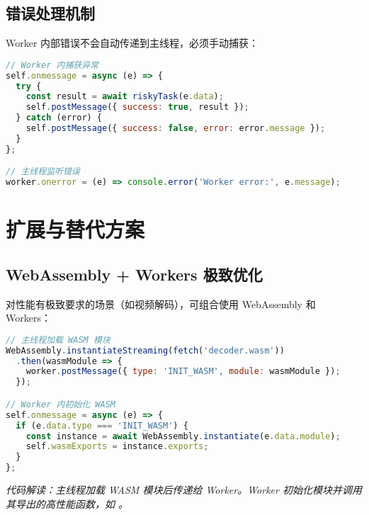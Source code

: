 \section{错误处理机制}
Worker 内部错误不会自动传递到主线程，必须手动捕获：\par
\begin{lstlisting}[language=javascript]
// Worker 内捕获异常
self.onmessage = async (e) => {
  try {
    const result = await riskyTask(e.data);
    self.postMessage({ success: true, result });
  } catch (error) {
    self.postMessage({ success: false, error: error.message });
  }
};

// 主线程监听错误
worker.onerror = (e) => console.error('Worker error:', e.message);
\end{lstlisting}
\chapter{扩展与替代方案}
\section{WebAssembly + Workers 极致优化}
对性能有极致要求的场景（如视频解码），可组合使用 WebAssembly 和 Workers：\par
\begin{lstlisting}[language=javascript]
// 主线程加载 WASM 模块
WebAssembly.instantiateStreaming(fetch('decoder.wasm'))
  .then(wasmModule => {
    worker.postMessage({ type: 'INIT_WASM', module: wasmModule });
  });

// Worker 内初始化 WASM
self.onmessage = async (e) => {
  if (e.data.type === 'INIT_WASM') {
    const instance = await WebAssembly.instantiate(e.data.module);
    self.wasmExports = instance.exports; 
  }
};
\end{lstlisting}
\textit{代码解读：主线程加载 WASM 模块后传递给 Worker。Worker 初始化模块并调用其导出的高性能函数，如 。}\par
